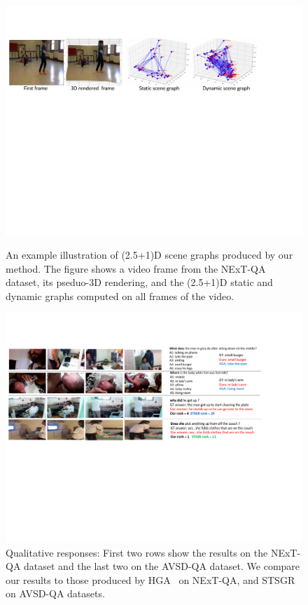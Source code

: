 \documentclass[letterpaper]{article}
\begin{document}
\begin{figure}[h]
    \centering
    \includegraphics[width=14.5cm,trim={0cm 13.5cm 3.5cm 3cm},clip]{./figs/quals_paper_1.pdf}
    \caption{An example illustration of (2.5+1)D scene graphs produced by our method. The figure shows a video frame from the NExT-QA dataset, its pseduo-3D rendering, and the (2.5+1)D static and dynamic graphs computed on all frames of the video.}
    \label{fig:next-qa-more-quals}
    \centering
     \includegraphics[width=14.5cm,trim={0.5cm 9cm 3.5cm 3cm},clip]{./figs/quals_paper_2.pdf}
    \caption{Qualitative responses: First two rows show the results on the NExT-QA dataset and the last two on the AVSD-QA dataset. We compare our results to those produced by HGA~\cite{fan2019heterogeneous} on NExT-QA, and STSGR~\cite{geng2021dynamic} on AVSD-QA datasets. }
    \label{fig:quals}
\end{figure}
\end{document}

